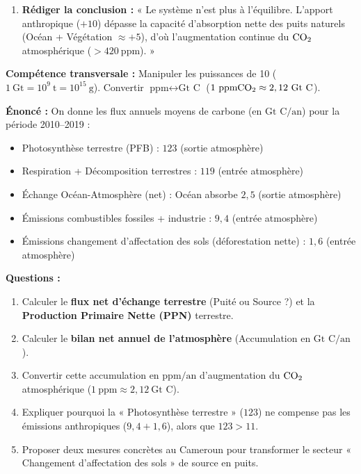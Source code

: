 \documentclass[11pt]{article}
\begin{document}
\begin{methode}
\begin{enumerate}
        \item \textbf{Rédiger la conclusion :} « Le système n'est plus à l'équilibre. L'apport anthropique ($+10$) dépasse la capacité d'absorption nette des puits naturels (Océan + Végétation $\approx +5$), d'où l'augmentation continue du $\ce{CO2}$ atmosphérique ($> 420\ \text{ppm}$). »
    \end{enumerate}
    \textbf{Compétence transversale :} Manipuler les puissances de 10 ($1\ \text{Gt} = 10^9\ \text{t} = 10^{15}\ \text{g}$). Convertir $\text{ppm} \leftrightarrow \text{Gt C}$ ($1\ \text{ppm} \ce{CO2} \approx 2,12\ \text{Gt C}$).
\end{methode}

\begin{exoresolu}
    \textbf{Énoncé :} On donne les flux annuels moyens de carbone (en $\text{Gt C/an}$) pour la période 2010--2019 :
    \begin{itemize}
        \item Photosynthèse terrestre (PFB) : $123$ (sortie atmosphère)
        \item Respiration + Décomposition terrestres : $119$ (entrée atmosphère)
        \item Échange Océan-Atmosphère (net) : Océan absorbe $2,5$ (sortie atmosphère)
        \item Émissions combustibles fossiles + industrie : $9,4$ (entrée atmosphère)
        \item Émissions changement d'affectation des sols (déforestation nette) : $1,6$ (entrée atmosphère)
    \end{itemize}
    \textbf{Questions :}
    \begin{enumerate}
        \item Calculer le \textbf{flux net d'échange terrestre} (Puité ou Source ?) et la \textbf{Production Primaire Nette (PPN)} terrestre.
        \item Calculer le \textbf{bilan net annuel de l'atmosphère} (Accumulation en $\text{Gt C/an}$).
        \item Convertir cette accumulation en $\text{ppm/an}$ d'augmentation du $\ce{CO2}$ atmosphérique ($1\ \text{ppm} \approx 2,12\ \text{Gt C}$).
        \item Expliquer pourquoi la « Photosynthèse terrestre » ($123$) ne compense pas les émissions anthropiques ($9,4 + 1,6$), alors que $123 > 11$.
        \item Proposer deux mesures concrètes au Cameroun pour transformer le secteur « Changement d'affectation des sols » de source en puits.

\end{enumerate}
\end{exoresolu}
\end{document}
